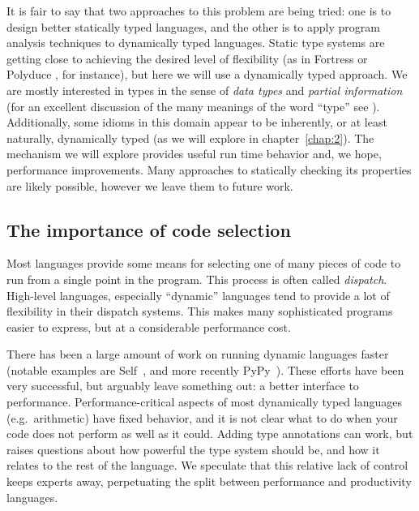 It is fair to say that two approaches to this problem are being tried: one is
to design better statically typed languages, and the other is to apply
program analysis techniques to dynamically typed languages.
Static type systems are getting close to achieving the desired level
of flexibility (as in Fortress \cite{fortresspec} or Polyduce \cite{polyduce1},
for instance),
but here we will use a dynamically typed approach.%
We are mostly interested in types in the sense of \emph{data types} and
\emph{partial information}
(for an excellent discussion of the many meanings of the word ``type''
see \cite{Kell2014}).
Additionally, some idioms in this domain appear to be inherently, or at least
naturally, dynamically typed (as we will explore in chapter~\ref{chap:2}).
The mechanism we will explore provides useful run time behavior and, we hope,
performance improvements.
Many approaches to statically checking its properties are likely possible,
however we leave them to future work.



\subsection{The importance of code selection}

Most languages provide some means for selecting one of many pieces of code
to run from a single point in the program.
This process is often called \emph{dispatch}.
High-level languages, especially ``dynamic'' languages tend to provide a
lot of flexibility in their dispatch systems.
This makes many sophisticated programs easier to express, but at a considerable
performance cost.

There has been a large amount of work on running dynamic languages faster
(notable examples are Self~\cite{selflang}, and more recently PyPy~\cite{pypyjit}).
These efforts have been very successful, but arguably leave something
out: a better interface to performance.
Performance-critical aspects of most dynamically typed languages (e.g.\ arithmetic)
have fixed behavior, and it is not clear what to do when your code does not
perform as well as it could.
Adding type annotations can work, but raises questions about how powerful
the type system should be, and how it relates to the rest of the language.
We speculate that this relative lack of control keeps experts away,
perpetuating the split between performance and productivity languages.


